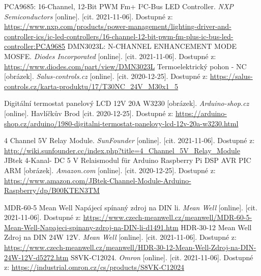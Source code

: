 \begin{thebibliography}{3}
PCA9685: 16-Channel, 12-Bit PWM Fm+ I²C-Bus LED Controller. \textit{NXP Semiconductors} [online]. [cit. 2021-11-06]. Dostupné z: \url{https://www.nxp.com/products/power-management/lighting-driver-and-controller-ics/ic-led-controllers/16-channel-12-bit-pwm-fm-plus-ic-bus-led-controller:PCA9685}
DMN3023L: N-CHANNEL ENHANCEMENT MODE MOSFE. \textit{Diodes Incorporated} [online]. [cit. 2021-11-06]. Dostupné z: \url{https://www.diodes.com/part/view/DMN3023L}
Termoelektrický pohon - NC [obrázek]. \textit{Salus-controls.cz} [online]. [cit. 2020-12-25]. Dostupné z: \url{https://salus-controls.cz/karta-produktu/17/T30NC\_24V\_M30x1\_5}

Digitální termostat panelový LCD 12V 20A W3230 [obrázek]. \textit{Arduino-shop.cz} [online]. Havlíčkův Brod [cit. 2020-12-25]. Dostupné z: \url{https://arduino-shop.cz/arduino/1980-digitalni-termostat-panelovy-lcd-12v-20a-w3230.html}

4 Channel 5V Relay Module. \textit{SunFounder} [online]. [cit. 2021-11-06]. Dostupné z: \url{http://wiki.sunfounder.cc/index.php?title=4_Channel_5V_Relay_Module}
JBtek 4-Kanal- DC 5 V Relaismodul für Arduino Raspberry Pi DSP AVR PIC ARM [obrázek]. \textit{Amazon.com} [online]. [cit. 2020-12-25]. Dostupné z: \url{https://www.amazon.com/JBtek-Channel-Module-Arduino-Raspberry/dp/B00KTEN3TM}

MDR-60-5 Mean Well Napájecí spínaný zdroj na DIN li. \textit{Mean Well} [online]. [cit. 2021-11-06]. Dostupné z: \url{https://www.czech-meanwell.cz/meanwell/MDR-60-5-Mean-Well-Napajeci-spinany-zdroj-na-DIN-li-d1491.htm}
HDR-30-12 Mean Well Zdroj na DIN 24W 12V. \textit{Mean Well} [online]. [cit. 2021-11-06]. Dostupné z: \url{https://www.czech-meanwell.cz/meanwell/HDR-30-12-Mean-Well-Zdroj-na-DIN-24W-12V-d5272.htm}
S8VK-C12024. \textit{Omron} [online]. [cit. 2021-11-06]. Dostupné z: \url{https://industrial.omron.cz/cs/products/S8VK-C12024}


\end{thebibliography}
